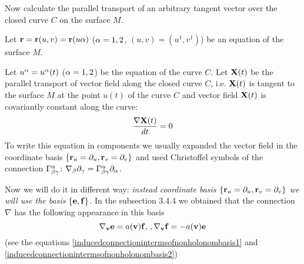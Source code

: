 \documentclass[12pt]{article}
\theoremstyle{theorem}
\numberwithin{equation}{section}
\begin{document}
{             Now calculate the parallel transport of an arbitrary tangent vector over the closed curve $C$
             on the surface $M$.



 Let ${\bf r}={\bf r}(u,v)={\bf r}(u\alpha)$ ($\alpha=1,2$, $(u,v)=(u^1,v^1)$) be an equation of the surface $M$.

Let $u^\alpha=u^\alpha(t)$ ($\alpha=1,2$) be the equation of the curve $C$.
Let ${\bf X}(t)$ be the parallel transport of vector field along the closed curve $C$,
i.e. ${\bf X}(t)$ is tangent to the surface $M$ at the point $u(t)$ of the curve $C$ and
vector field ${\bf X}(t)$ is covariantly constant along the curve:
      $$
    {\nabla {\bf X}(t)\over dt}=0
      $$
     To write this equation in components we usually  expanded the vector field
in the coordinate basis $\{{\bf r}_u=\partial_u,{\bf r}_v=\partial_v\}$ and used Christoffel symbols of the connection
  $\Gamma^\alpha_{\beta\gamma}\colon \nabla_\beta\partial_\gamma=\Gamma^\alpha_{\beta\gamma}\partial_\alpha$.

  Now we will do it in different way: {\it instead coordinate basis $\{{\bf r}_u=\partial_u,{\bf r}_v=\partial_v\}$ we will use
  the basis $\{{\bf e},{\bf f}\}$.}   In the subsection 3.4.4 we obtained that the connection $\nabla$ has the following appearance
  in this basis
  \begin{equation}\label{indconforrotation}
    \nabla_{\bf v}{\bf e}=a({\bf v}){\bf f},\,, \nabla_{\bf v}{\bf f}=-a({\bf v}){\bf e}
  \end{equation}
  (see the equations \eqref{inducedconnectionintermsofnonholonombasis1} and \eqref{inducedconnectionintermsofnonholonombasis2})

}
\end{document}
